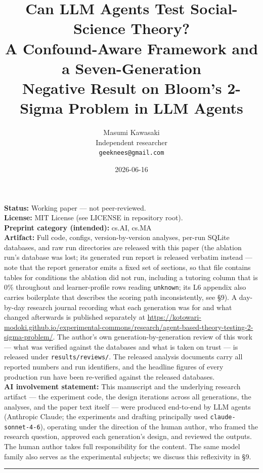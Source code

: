 \documentclass[11pt]{article}
\title{\textbf{Can LLM Agents Test Social-Science Theory?}\\[0.4em]
A Confound-Aware Framework and a Seven-Generation\\
Negative Result on Bloom's 2-Sigma Problem in LLM Agents}
\author{
  Masumi Kawasaki\\
  Independent researcher\\
  \texttt{geeknees@gmail.com}
}
\date{2026-06-16}
\begin{document}
\maketitle

\noindent\textbf{Status:} Working paper --- not peer-reviewed.\\
\textbf{License:} MIT License (see LICENSE in repository root).\\
\textbf{Preprint category (intended):} cs.AI, cs.MA\\
\textbf{Artifact:} Full code, configs, version-by-version analyses, per-run SQLite databases, and raw run directories are released with this paper (the ablation run's database was lost; its generated run report is released verbatim instead --- note that the report generator emits a fixed set of sections, so that file contains tables for conditions the ablation did not run, including a tutoring column that is 0\% throughout and learner-profile rows reading \texttt{unknown}; its L6 appendix also carries boilerplate that describes the scoring path inconsistently, see \S9). A day-by-day research journal recording what each generation was for and what changed afterwards is published separately at \url{https://kotowari-modoki.github.io/experimental-commons/research/agent-based-theory-testing-2-sigma-problem/}. The author's own generation-by-generation review of this work --- what was verified against the databases and what is taken on trust --- is released under \texttt{results/reviews/}. The released analysis documents carry all reported numbers and run identifiers, and the headline figures of every production run have been re-verified against the released databases.\\[0.5em]
\textbf{AI involvement statement:} This manuscript and the underlying research artifact --- the experiment code, the design iterations across all generations, the analyses, and the paper text itself --- were produced end-to-end by LLM agents (Anthropic Claude; the experiments and drafting principally used \texttt{claude-sonnet-4-6}), operating under the direction of the human author, who framed the research question, approved each generation's design, and reviewed the outputs. The human author takes full responsibility for the content. The same model family also serves as the experimental subjects; we discuss this reflexivity in \S9.

\hrule\vspace{1em}
\end{document}
